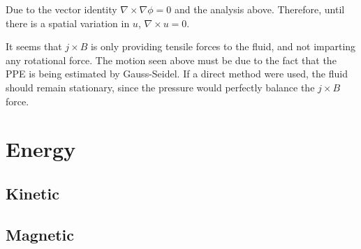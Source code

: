 \documentclass[11pt]{article}
\begin{document}
Due to the vector identity $\nabla \times \nabla \phi=0$ and the analysis above. Therefore, until there is a spatial variation in $u$, $\nabla \times u=0$.

It seems that $j \times B$ is only providing tensile forces to the fluid, and not imparting any rotational force. The motion seen above must be due to the fact that the PPE is being estimated by Gauss-Seidel. If a direct method were used, the fluid should remain stationary, since the pressure would perfectly balance the $j \times B$ force.

\section{Energy}


\subsection{Kinetic}

\subsection{Magnetic}

\end{document}
